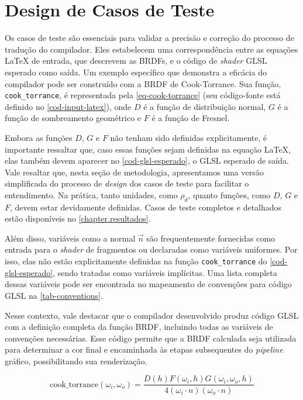 \section{Design de Casos de Teste} \label{testes}
%
%
Os casos de teste são essenciais para validar a precisão e correção do processo de tradução do compilador. Eles estabelecem uma correspondência entre as equações \LaTeX{} de entrada, que descrevem as BRDFs, e o código de \textit{shader} GLSL esperado como saída. Um exemplo específico que demonstra a eficácia do compilador pode ser construído com a BRDF de Cook-Torrance. Sua função, \texttt{cook\_torrance}, é representada pela \autoref{eq-cook-torrance} (seu código-fonte está definido no \autoref{cod-input-latex}), onde \(D\) é a função de distribuição normal, \(G\) é a função de sombreamento geométrico e \(F\) é a função de Fresnel.


Embora as funções \(D\), \(G\) e \(F\) não tenham sido definidas explicitamente, é importante ressaltar que, caso essas funções sejam definidas na equação \LaTeX{}, elas também devem aparecer no \autoref{cod-glsl-esperado}, o GLSL esperado de saída. Vale resaltar que, nesta seção de metodologia, apresentamos uma versão simplificada do processo de \textit{design} dos casos de teste para facilitar o entendimento. Na prática, tanto unidades, como $\rho_d$, quanto funções, como \(D\), \(G\) e \(F\), devem estar devidamente definidas. Casos de teste completos e detalhados estão disponíveis no \autoref{chapter.resultados}.


Além disso, variáveis como a normal \( \vec{n} \) são frequentemente fornecidas como entrada para o \textit{shader} de fragmentos ou declaradas como variáveis uniformes. Por isso, elas não estão explicitamente definidas na função \texttt{cook\_torrance} do \autoref{cod-glsl-esperado}, sendo tratadas como variáveis implícitas. Uma lista completa dessas variáveis pode ser encontrada no mapeamento de convenções para código GLSL na \autoref{tab-conventions}.

Nesse contexto, vale destacar que o compilador desenvolvido produz código GLSL com a definição completa da função BRDF, incluindo todas as variáveis de convenções necessárias. Esse código permite que a BRDF calculada seja utilizada para determinar a cor final e encaminhada às etapas subsequentes do \textit{pipeline} gráfico, possibilitando sua renderização.


\begin{equation} \label{eq-cook-torrance}
  \text{cook\_torrance}(\omega_i, \omega_o) = \frac{D(h)F(\omega_i, h)G(\omega_i, \omega_o, h)}{4(\omega_i \cdot n)(\omega_o \cdot n)}
\end{equation}


